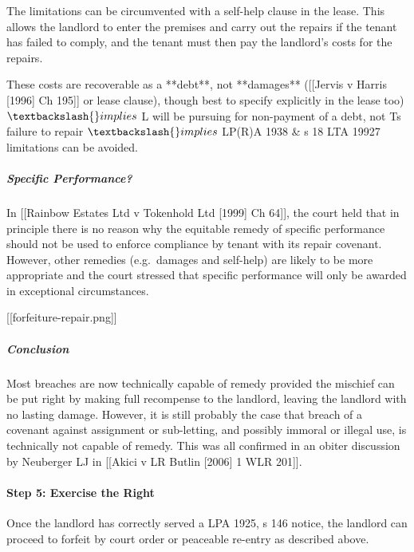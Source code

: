 \documentclass[
]{article}
\newenvironment{Shaded}{}{}
\newcommand{\NormalTok}[1]{#1}
\begin{document}
The limitations can be circumvented with a self-help clause in the
lease. This allows the landlord to enter the premises and carry out the
repairs if the tenant has failed to comply, and the tenant must then pay
the landlord's costs for the repairs.

\begin{Shaded}
\begin{Highlighting}[]
\NormalTok{These costs are recoverable as a **debt**, not **damages** ([[Jervis v Harris [1996] Ch 195]] or lease clause), though best to specify explicitly in the lease too) $\textbackslash{}implies$ L will be pursuing for non{-}payment of a debt, not T\textquotesingle{}s failure to repair $\textbackslash{}implies$ LP(R)A 1938 \& s 18 LTA 19927 limitations can be avoided. }
\end{Highlighting}
\end{Shaded}

\hypertarget{specific-performance}{%
\subparagraph{Specific Performance?}\label{specific-performance}}

In {[}{[}Rainbow Estates Ltd v Tokenhold Ltd {[}1999{]} Ch 64{]}{]}, the
court held that in principle there is no reason why the equitable remedy
of specific performance should not be used to enforce compliance by
tenant with its repair covenant. However, other remedies (e.g.~damages
and self-help) are likely to be more appropriate and the court stressed
that specific performance will only be awarded in exceptional
circumstances.

{[}{[}forfeiture-repair.png{]}{]}

\hypertarget{conclusion}{%
\subparagraph{Conclusion}\label{conclusion}}

Most breaches are now technically capable of remedy provided the
mischief can be put right by making full recompense to the landlord,
leaving the landlord with no lasting damage. However, it is still
probably the case that breach of a covenant against assignment or
sub-letting, and possibly immoral or illegal use, is technically not
capable of remedy. This was all confirmed in an obiter discussion by
Neuberger LJ in {[}{[}Akici v LR Butlin {[}2006{]} 1 WLR 201{]}{]}.

\hypertarget{step-5-exercise-the-right}{%
\paragraph{Step 5: Exercise the Right}\label{step-5-exercise-the-right}}

Once the landlord has correctly served a LPA 1925, s 146 notice, the
landlord can proceed to forfeit by court order or peaceable re-entry as
described above.
\end{document}
